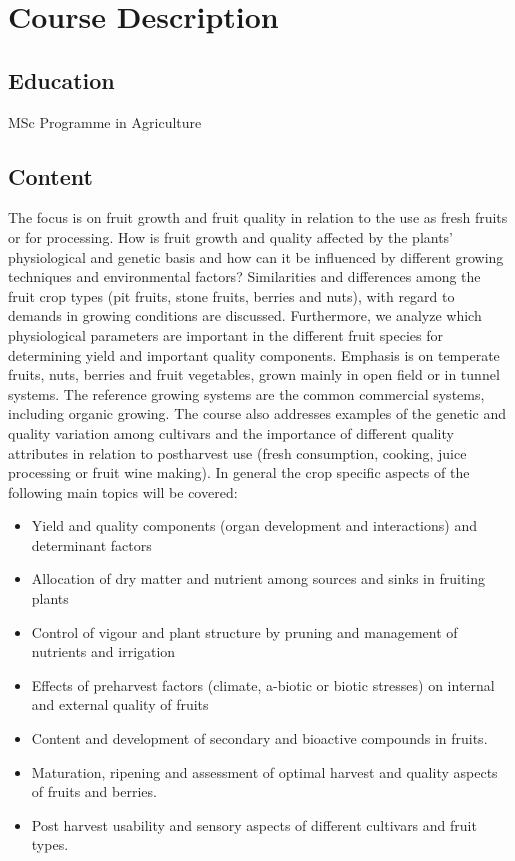 \chapter*{Course Description}
\setlength{\headheight}{12.71342pt}
\addtolength{\topmargin}{-0.71342pt}

\section*{Education}
MSc Programme in Agriculture


\section*{Content}
The focus is on fruit growth and fruit quality in relation to the use as fresh fruits or for processing. How is fruit growth and quality affected by the plants' physiological and genetic basis and how can it be influenced by different growing techniques and environmental factors? Similarities and differences among the fruit crop types (pit fruits, stone fruits, berries and nuts), with regard to demands in growing conditions are discussed. Furthermore, we analyze which physiological parameters are important in the different fruit species for determining yield and important quality components. Emphasis is on temperate fruits, nuts, berries and fruit vegetables, grown mainly in open field or in tunnel systems. The reference growing systems are the common commercial systems, including organic growing. The course also addresses examples of the genetic and quality variation among cultivars and the importance of different quality attributes in relation to postharvest use (fresh consumption, cooking, juice processing or fruit wine making).
In general the crop specific aspects of the following main topics will be covered:
\begin{itemize}
    \item Yield and quality components (organ development and interactions) and determinant factors
    \item Allocation of dry matter and nutrient  among sources and sinks in fruiting plants
    \item Control of vigour and plant structure by pruning and management of nutrients and irrigation
    \item Effects of preharvest factors (climate, a-biotic or biotic stresses) on internal and external quality of fruits
    \item Content and development of secondary and bioactive compounds in fruits.
    \item Maturation, ripening and assessment of optimal harvest and quality aspects of fruits and berries.
    \item Post harvest usability and sensory aspects of different cultivars and fruit types.
\end{itemize}  

